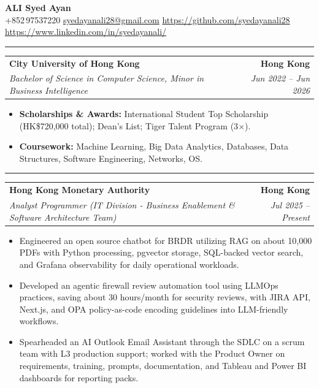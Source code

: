 \documentclass[9pt,a4paper]{article}
\makeatletter
\newcommand{\ressection}[1]{%
  \vspace{0.8em}%
  \noindent{\large\scshape\bfseries #1}\par\nobreak
  \vspace{-\parskip}%
  \noindent\rule{\linewidth}{0.1pt}\par\nobreak
  \vspace{-\parskip}%
}
\newcommand{\resumeSubheading}[4]{%
  \vspace{0.6em}%
  \begin{tabular*}{\textwidth}{l@{\extracolsep{\fill}}r}
    \textbf{#1} & \textbf{#2} \\
    \textit{\small #3} & \textit{\small #4} \\
  \end{tabular*}\vspace{0.32em}}
\makeatother
\begin{document}
\begin{center}
  {\LARGE\bfseries ALI Syed Ayan}\\[0.35em]
  \small
  +852\,97537220 \;\textbar\;
  \href{mailto:syedayanali28@gmail.com}{syedayanali28@gmail.com} \;\textbar\;
  \href{https://github.com/syedayanali28}{https://github.com/syedayanali28} \;\textbar\;
  \href{https://www.linkedin.com/in/syedayanali/}{https://www.linkedin.com/in/syedayanali/}
\end{center}
\vspace{0.55em}
\small

\ressection{Education}
\resumeSubheading{City University of Hong Kong}{Hong Kong}{Bachelor of Science in Computer Science, Minor in Business Intelligence}{Jun 2022 -- Jun 2026}
\begin{itemize}
  \item \textbf{Scholarships \& Awards:} International Student Top Scholarship (HK\$720{,}000 total); Dean's List; Tiger Talent Program (3$\times$).
  \item \textbf{Coursework:} Machine Learning, Big Data Analytics, Databases, Data Structures, Software Engineering, Networks, OS.
\end{itemize}

\ressection{Work Experience}

\resumeSubheading{Hong Kong Monetary Authority}{Hong Kong}{Analyst Programmer (IT Division - Business Enablement \& Software Architecture Team)}{Jul 2025 -- Present}
\begin{itemize}
  \item Engineered an open source chatbot for BRDR utilizing RAG on about 10{,}000 PDFs with Python processing, pgvector storage, SQL-backed vector search, and Grafana observability for daily operational workloads.
  \item Developed an agentic firewall review automation tool using LLMOps practices, saving about 30 hours/month for security reviews, with JIRA API, Next.js, and OPA policy-as-code encoding guidelines into LLM-friendly workflows.
  \item Spearheaded an AI Outlook Email Assistant through the SDLC on a scrum team with L3 production support; worked with the Product Owner on requirements, training, prompts, documentation, and Tableau and Power BI dashboards for reporting packs.
\end{itemize}
\end{document}
